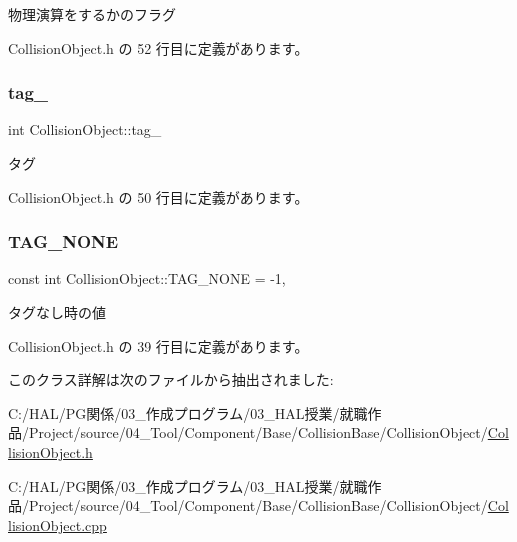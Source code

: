 物理演算をするかのフラグ 



 Collision\+Object.\+h の 52 行目に定義があります。

\mbox{\label{class_collision_object_a104bfc5534ba8ea189a45de9ba32f6ee}} 
\subsubsection{\texorpdfstring{tag\+\_\+}{tag\_}}
{\footnotesize\ttfamily int Collision\+Object\+::tag\+\_\+\hspace{0.3cm}{\ttfamily [private]}}



タグ 



 Collision\+Object.\+h の 50 行目に定義があります。

\mbox{\label{class_collision_object_a22badef1e6fc9c2b1f002bd99ede049f}} 
\subsubsection{\texorpdfstring{T\+A\+G\+\_\+\+N\+O\+NE}{TAG\_NONE}}
{\footnotesize\ttfamily const int Collision\+Object\+::\+T\+A\+G\+\_\+\+N\+O\+NE = -\/1\hspace{0.3cm}{\ttfamily [static]}, {\ttfamily [private]}}



タグなし時の値 



 Collision\+Object.\+h の 39 行目に定義があります。



このクラス詳解は次のファイルから抽出されました\+:\begin{DoxyCompactItemize}
\item 
C\+:/\+H\+A\+L/\+P\+G関係/03\+\_\+作成プログラム/03\+\_\+\+H\+A\+L授業/就職作品/\+Project/source/04\+\_\+\+Tool/\+Component/\+Base/\+Collision\+Base/\+Collision\+Object/\mbox{\hyperlink{_collision_object_8h}{Collision\+Object.\+h}}\item 
C\+:/\+H\+A\+L/\+P\+G関係/03\+\_\+作成プログラム/03\+\_\+\+H\+A\+L授業/就職作品/\+Project/source/04\+\_\+\+Tool/\+Component/\+Base/\+Collision\+Base/\+Collision\+Object/\mbox{\hyperlink{_collision_object_8cpp}{Collision\+Object.\+cpp}}\end{DoxyCompactItemize}
